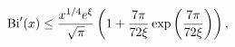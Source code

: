 \[\mathop{\mathrm{Bi}\/}\nolimits'\!\left(x\right)\leq\frac{x^{1/4}e^{\xi}}{%
\sqrt{\pi}}\left(1+\frac{7\pi}{72\xi}\mathop{\exp\/}\nolimits\left(\frac{7\pi}%
{72\xi}\right)\right),\]